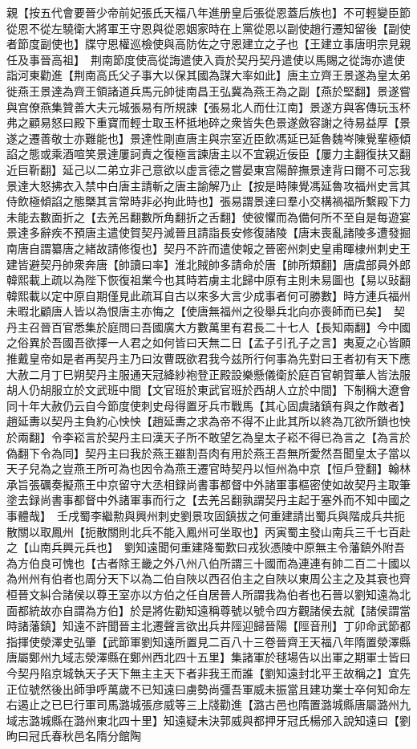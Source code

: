 親【按五代會要晉少帝前妃張氏天福八年進册皇后張從恩蓋后族也】不可輕變臣節從恩不從左驍衛大將軍王守恩與從恩姻家時在上黨從恩以副使趙行遷知留後【副使者節度副使也】牒守恩權巡檢使與高防佐之守恩建立之子也【王建立事唐明宗見親任及事晉高祖】　荆南節度使高從誨遣使入貢於契丹契丹遣使以馬賜之從誨亦遣使詣河東勸進【荆南高氏父子事大以保其國為謀大率如此】唐主立齊王景遂為皇太弟徙燕王景達為齊王領諸道兵馬元帥徙南昌王弘冀為燕王為之副【燕於堅翻】景遂嘗與宫僚燕集贊善大夫元城張易有所規諫【張易北人而仕江南】景遂方與客傳玩玉杯弗之顧易怒曰殿下重寶而輕士取玉杯抵地碎之衆皆失色景遂斂容謝之待易益厚【景遂之遷善敬士亦難能也】景達性剛直唐主與宗室近臣飲馮延已延魯魏岑陳覺輩極傾諂之態或乘酒喧笑景達屢訶責之復極言諫唐主以不宜親近佞臣【屢力主翻復扶又翻近巨靳翻】延己以二弟立非己意欲以虚言德之嘗晏東宫陽醉撫景達背曰爾不可忘我景達大怒拂衣入禁中白唐主請斬之唐主諭解乃止【按是時陳覺馮延魯攻福州史言其侍飲極傾諂之態槩其言常時非必拘此時也】張易謂景達曰羣小交構禍福所繫殿下力未能去數面折之【去羌呂翻數所角翻折之舌翻】使彼懼而為備何所不至自是每遊宴景達多辭疾不預唐主遣使賀契丹滅晉且請詣長安修復諸陵【唐末喪亂諸陵多遭發掘南唐自謂纂唐之緒故請修復也】契丹不許而遣使報之晉密州刺史皇甫暉棣州刺史王建皆避契丹帥衆奔唐【帥讀曰率】淮北賊帥多請命於唐【帥所類翻】唐虞部員外郎韓熙載上疏以為陛下恢復祖業今也其時若虜主北歸中原有主則未易圖也【易以䜴翻韓熙載以定中原自期僅見此疏耳自古以來多大言少成事者何可勝數】時方連兵福州未暇北顧唐人皆以為恨唐主亦悔之【使唐無福州之役舉兵北向亦喪師而已矣】　契丹主召晉百官悉集於庭問曰吾國廣大方數萬里有君長二十七人【長知兩翻】今中國之俗異於吾國吾欲擇一人君之如何皆曰天無二日【孟子引孔子之言】夷夏之心皆願推戴皇帝如是者再契丹主乃曰汝曹既欲君我今兹所行何事為先對曰王者初有天下應大赦二月丁巳朔契丹主服通天冠絳紗袍登正殿設樂懸儀衛於庭百官朝賀華人皆法服胡人仍胡服立於文武班中間【文官班於東武官班於西胡人立於中間】下制稱大遼會同十年大赦仍云自今節度使刺史母得置牙兵市戰馬【其心固虞諸鎮有與之作敵者】趙延夀以契丹主負約心怏怏【趙延夀之求為帝不得不止此其所以終為兀欲所鎖也怏於兩翻】令李崧言於契丹主曰漢天子所不敢望乞為皇太子崧不得已為言之【為言於偽翻下令為同】契丹主曰我於燕王雖割吾肉有用於燕王吾無所愛然吾聞皇太子當以天子兒為之豈燕王所可為也因令為燕王遷官時契丹以恒州為中京【恒戶登翻】翰林承旨張礪奏擬燕王中京留守大丞相録尚書事都督中外諸軍事樞密使如故契丹主取筆塗去録尚書事都督中外諸軍事而行之【去羌呂翻孰謂契丹主起于塞外而不知中國之事體哉】　壬戌蜀李繼勲與興州刺史劉景攻固鎮拔之何重建請出蜀兵與階成兵共扼散關以取鳳州【扼散關則北兵不能入鳳州可坐取也】丙寅蜀主發山南兵三千七百赴之【山南兵興元兵也】　劉知遠聞何重建降蜀歎曰戎狄憑陵中原無主令藩鎮外附吾為方伯良可愧也【古者除王畿之外八州八伯所謂三十國而為連連有帥二百二十國以為州州有伯者也周分天下以為二伯自陜以西召伯主之自陜以東周公主之及其衰也齊桓晉文糾合諸侯以尊王室亦以方伯之任自居晉人所謂我為伯者也石晉以劉知遠為北面都統故亦自謂為方伯】於是將佐勸知遠稱尊號以號令四方觀諸侯去就【諸侯謂當時諸藩鎮】知遠不許聞晉主北遷聲言欲出兵井陘迎歸晉陽【陘音刑】丁卯命武節都指揮使滎澤史弘肇【武節軍劉知遠所置見二百八十三卷晉齊王天福八年隋置滎澤縣唐屬鄭州九域志滎澤縣在鄭州西北四十五里】集諸軍於毬場告以出軍之期軍士皆曰今契丹陷京城執天子天下無主主天下者非我王而誰【劉知遠封北平王故稱之】宜先正位號然後出師爭呼萬歲不已知遠曰虜勢尚彊吾軍威未振當且建功業士卒何知命左右遏止之已巳行軍司馬潞城張彦威等三上牋勸進【潞古邑也隋置潞城縣唐屬潞州九域志潞城縣在潞州東北四十里】知遠疑未決郭威與都押牙冠氏楊邠入說知遠曰【劉昫曰冠氏春秋邑名隋分館陶